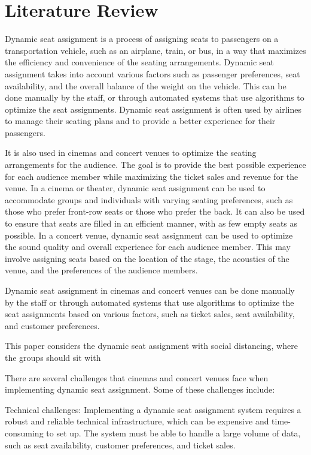 \section{Literature Review}

Dynamic seat assignment is a process of assigning seats to passengers on a transportation vehicle, such as an airplane, train, or bus, in a way that maximizes the efficiency and convenience of the seating arrangements. Dynamic seat assignment takes into account various factors such as passenger preferences, seat availability, and the overall balance of the weight on the vehicle. This can be done manually by the staff, or through automated systems that use algorithms to optimize the seat assignments. Dynamic seat assignment is often used by airlines to manage their seating plans and to provide a better experience for their passengers.

It is also used in cinemas and concert venues to optimize the seating arrangements for the audience. The goal is to provide the best possible experience for each audience member while maximizing the ticket sales and revenue for the venue. In a cinema or theater, dynamic seat assignment can be used to accommodate groups and individuals with varying seating preferences, such as those who prefer front-row seats or those who prefer the back. It can also be used to ensure that seats are filled in an efficient manner, with as few empty seats as possible. In a concert venue, dynamic seat assignment can be used to optimize the sound quality and overall experience for each audience member. This may involve assigning seats based on the location of the stage, the acoustics of the venue, and the preferences of the audience members.

Dynamic seat assignment in cinemas and concert venues can be done manually by the staff or through automated systems that use algorithms to optimize the seat assignments based on various factors, such as ticket sales, seat availability, and customer preferences.

This paper considers the dynamic seat assignment with social distancing, where the groups should sit with 


There are several challenges that cinemas and concert venues face when implementing dynamic seat assignment. Some of these challenges include:

Technical challenges: Implementing a dynamic seat assignment system requires a robust and reliable technical infrastructure, which can be expensive and time-consuming to set up. The system must be able to handle a large volume of data, such as seat availability, customer preferences, and ticket sales.

